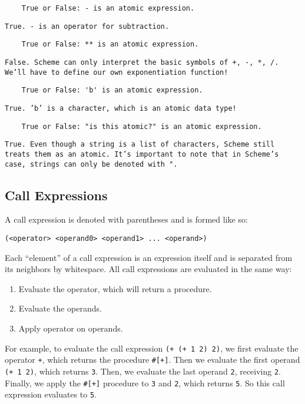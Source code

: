 \begin{lstlisting}
    True or False: - is an atomic expression.
\end{lstlisting}
\begin{solution}[0.25in]
    \texttt{True. - is an operator for subtraction.}
\end{solution}

\begin{lstlisting}
    True or False: ** is an atomic expression.
\end{lstlisting}
\begin{solution}[0.25in]
    \texttt{False. Scheme can only interpret the basic symbols of +, -, *, /. We'll have to define our own exponentiation function!}
\end{solution}

\begin{lstlisting}
    True or False: 'b' is an atomic expression.
\end{lstlisting}
\begin{solution}[0.25in]
    \texttt{True. 'b' is a character, which is an atomic data type!}
\end{solution}

\begin{lstlisting}
    True or False: "is this atomic?" is an atomic expression.
\end{lstlisting}
\begin{solution}[0.25in]
    \texttt{True. Even though a string is a list of characters, Scheme still treats them as an atomic. It's important to note that in Scheme's case, strings can only be denoted with ".}
\end{solution}

\subsection{Call Expressions}

A call expression is denoted with parentheses and is formed like so:
\vspace{0.5mm}
\begin{lstlisting}
(<operator> <operand0> <operand1> ... <operand>)
\end{lstlisting}
Each ``element'' of a call expression is an expression itself and is separated from its
neighbors by whitespace. All call expressions are evaluated in the same way:
\begin{enumerate}
\item Evaluate the operator, which will return a procedure.
\item Evaluate the operands.
\item Apply operator on operands.
\end{enumerate}
For example, to evaluate the call expression \lstinline{(+ (+ 1 2) 2)}, we first evaluate the operator \lstinline{+}, which returns the procedure \lstinline{#[+]}. Then we evaluate the first operand \lstinline{(+ 1 2)}, which returns \lstinline{3}. Then, we evaluate the last operand \lstinline{2}, receiving \lstinline{2}. Finally, we apply the \lstinline{#[+]} procedure to \lstinline{3} and \lstinline{2}, which returns \lstinline{5}. So this call expression evaluates to \lstinline{5}. 

